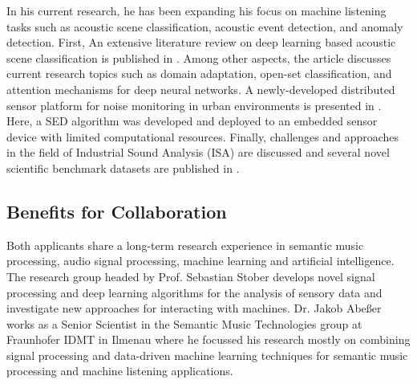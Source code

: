 \documentclass[11pt]{article}
\begin{document}
In his current research, he has been expanding his focus on machine listening tasks such as acoustic scene classification, acoustic event detection, and anomaly detection.
First, 
An extensive literature review on deep learning based acoustic scene classification is published in . Among other aspects, the article discusses current research topics such as domain adaptation, open-set classification, and attention mechanisms for deep neural networks.
A newly-developed distributed sensor platform for noise monitoring in urban environments is presented in . Here, a SED algorithm was developed and deployed to an embedded sensor device with limited computational resources.
Finally, challenges and approaches in the field of Industrial Sound Analysis (ISA) are discussed and several novel scientific benchmark datasets are published in .

\subsection*{Benefits for Collaboration}

Both applicants share a long-term research experience in semantic music processing, audio signal processing, machine learning and artificial intelligence. The research group headed by Prof. Sebastian Stober develops novel signal processing and deep learning algorithms for the analysis of sensory data and investigate new approaches for interacting with machines.
Dr. Jakob Abeßer works as a Senior Scientist in the Semantic Music Technologies group at Fraunhofer IDMT in Ilmenau where he focussed his research mostly on combining signal processing and data-driven machine learning techniques for semantic music processing and machine listening applications.
\end{document}
